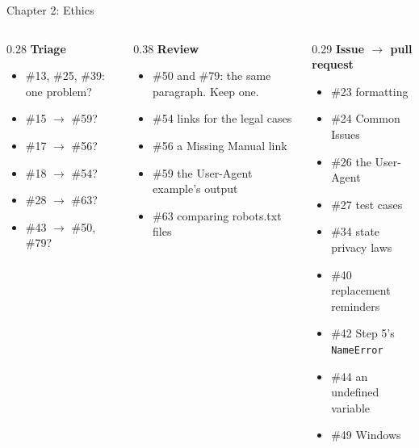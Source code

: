 \documentclass[9pt,aspectratio=169]{beamer}
\begin{document}
\begin{frame}{Chapter 2: Ethics}
    \begin{columns}[T]
        \begin{column}{0.28\textwidth}
            \textbf{Triage}
            \begin{itemize}\small
                \item \#13, \#25, \#39: one problem?
                \item \#15 $\to$ \#59?
                \item \#17 $\to$ \#56?
                \item \#18 $\to$ \#54?
                \item \#28 $\to$ \#63?
                \item \#43 $\to$ \#50, \#79?
            \end{itemize}
        \end{column}
        \begin{column}{0.38\textwidth}
            \textbf{Review}
            \begin{itemize}\small
                \item \#50 and \#79: the same paragraph. Keep one.
                \item \#54 links for the legal cases
                \item \#56 a Missing Manual link
                \item \#59 the User-Agent example's output
                \item \#63 comparing robots.txt files
            \end{itemize}
        \end{column}
        \begin{column}{0.29\textwidth}
            \textbf{Issue $\to$ pull request}
            \begin{itemize}\small
                \item \#23 formatting
                \item \#24 Common Issues
                \item \#26 the User-Agent
                \item \#27 test cases
                \item \#34 state privacy laws
                \item \#40 replacement reminders
                \item \#42 Step 5's \texttt{NameError}
                \item \#44 an undefined variable
                \item \#49 Windows
            \end{itemize}
        \end{column}
    \end{columns}
\end{frame}
\end{document}
